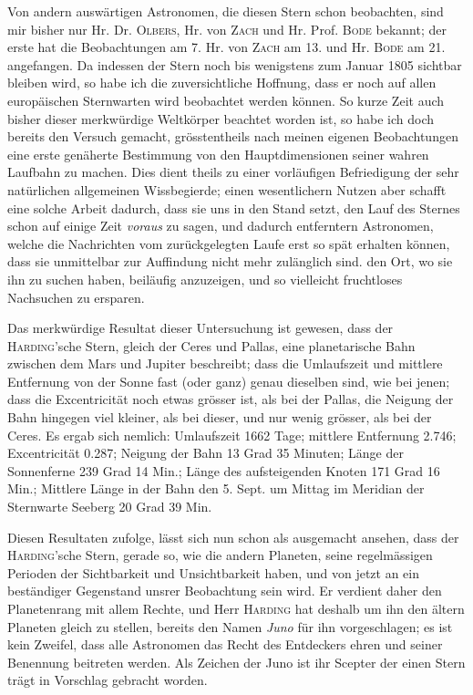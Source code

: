 Von andern auswärtigen Astronomen, die diesen Stern schon beobachten, sind mir bisher nur
Hr. Dr. \textsc{Olbers}, Hr. von \textsc{Zach} und Hr. Prof. \textsc{Bode} bekannt; der erste hat
die Beobachtungen am 7. Hr. von \textsc{Zach} am 13. und Hr. \textsc{Bode} am 21. angefangen. Da
indessen der Stern noch bis wenigstens zum Januar 1805 sichtbar bleiben wird, so habe ich die
zuversichtliche Hoffnung, dass er noch auf allen europäischen Sternwarten wird beobachtet werden
können. So kurze Zeit auch bisher dieser merkwürdige Weltkörper beachtet worden ist, so habe
ich doch bereits den Versuch gemacht, grösstentheils nach meinen eigenen Beobachtungen eine erste
genäherte Bestimmung von den Hauptdimensionen seiner wahren Laufbahn zu machen. Dies dient
theils zu einer vorläufigen Befriedigung der sehr natürlichen allgemeinen Wissbegierde; einen
wesentlichern Nutzen aber schafft eine solche Arbeit dadurch, dass sie uns in den Stand setzt, den
Lauf des Sternes schon auf einige Zeit \emph{voraus} zu sagen, und dadurch entferntern Astronomen,
welche die Nachrichten vom zurückgelegten Laufe erst so spät erhalten können, dass sie
unmittelbar zur Auffindung nicht mehr zulänglich sind. den Ort, wo sie ihn zu suchen haben,
beiläufig anzuzeigen, und so vielleicht fruchtloses Nachsuchen zu ersparen.

Das merkwürdige Resultat dieser Untersuchung ist gewesen, dass der \textsc{Harding}'sche Stern,
gleich der Ceres und Pallas, eine planetarische Bahn zwischen dem Mars und Jupiter beschreibt;
dass die Umlaufszeit und mittlere Entfernung von der Sonne fast (oder ganz) genau dieselben sind,
wie bei jenen; dass die Excentricität noch etwas grösser ist, als bei der Pallas, die Neigung
der Bahn hingegen viel kleiner, als bei dieser, und nur wenig grösser, als bei der Ceres. Es
ergab sich nemlich: Umlaufszeit 1662 Tage; mittlere Entfernung 2.746; Excentricität 0.287;
Neigung der Bahn 13 Grad 35 Minuten; Länge der Sonnenferne 239 Grad 14 Min.; Länge des
aufsteigenden Knoten 171 Grad 16 Min.; Mittlere Länge in der Bahn den 5. Sept. um Mittag im
Meridian der Sternwarte Seeberg 20 Grad 39 Min.

Diesen Resultaten zufolge, lässt sich nun schon als ausgemacht ansehen, dass der
\textsc{Harding}'sche Stern, gerade so, wie die andern Planeten, seine regelmässigen Perioden
der Sichtbarkeit und Unsichtbarkeit haben, und von jetzt an ein beständiger Gegenstand unsrer
Beobachtung sein wird. Er verdient daher den Planetenrang mit allem Rechte, und Herr
\textsc{Harding} hat deshalb um ihn den ältern Planeten gleich zu stellen, bereits den Namen
\emph{Juno} für ihn vorgeschlagen; es ist kein Zweifel, dass alle Astronomen das Recht des
Entdeckers ehren und seiner Benennung beitreten werden. Als Zeichen der Juno ist ihr Scepter der
einen Stern trägt in Vorschlag gebracht worden.


